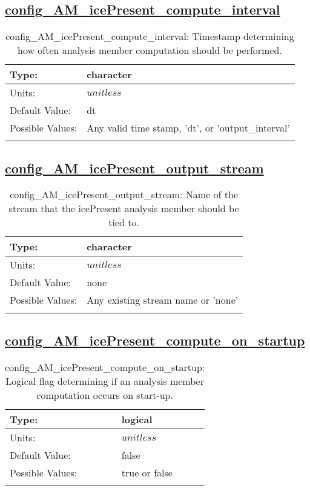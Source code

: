 \subsection[config\_AM\_icePresent\_compute\_interval]{\hyperref[sec:nm_tab_AM_icePresent]{config\_AM\_icePresent\_compute\_interval}}
\label{subsec:nm_sec_config_AM_icePresent_compute_interval}
\begin{center}
\begin{longtable}{| p{2.0in} || p{4.0in} |}
    \hline
    Type: & character \\
    \hline
    Units: & $unitless$ \\
    \hline
    Default Value: & dt \\
    \hline
    Possible Values: & Any valid time stamp, 'dt', or 'output\_interval' \\
    \hline
    \caption{config\_AM\_icePresent\_compute\_interval: Timestamp determining how often analysis member computation should be performed.}
\end{longtable}
\end{center}
\subsection[config\_AM\_icePresent\_output\_stream]{\hyperref[sec:nm_tab_AM_icePresent]{config\_AM\_icePresent\_output\_stream}}
\label{subsec:nm_sec_config_AM_icePresent_output_stream}
\begin{center}
\begin{longtable}{| p{2.0in} || p{4.0in} |}
    \hline
    Type: & character \\
    \hline
    Units: & $unitless$ \\
    \hline
    Default Value: & none \\
    \hline
    Possible Values: & Any existing stream name or 'none' \\
    \hline
    \caption{config\_AM\_icePresent\_output\_stream: Name of the stream that the icePresent analysis member should be tied to.}
\end{longtable}
\end{center}
\subsection[config\_AM\_icePresent\_compute\_on\_startup]{\hyperref[sec:nm_tab_AM_icePresent]{config\_AM\_icePresent\_compute\_on\_startup}}
\label{subsec:nm_sec_config_AM_icePresent_compute_on_startup}
\begin{center}
\begin{longtable}{| p{2.0in} || p{4.0in} |}
    \hline
    Type: & logical \\
    \hline
    Units: & $unitless$ \\
    \hline
    Default Value: & false \\
    \hline
    Possible Values: & true or false \\
    \hline
    \caption{config\_AM\_icePresent\_compute\_on\_startup: Logical flag determining if an analysis member computation occurs on start-up.}
\end{longtable}
\end{center}

